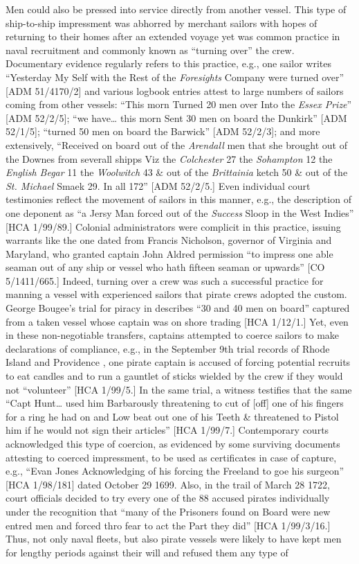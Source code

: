 Men could also be pressed into service directly from another vessel. This type of ship-to-ship impressment was abhorred by merchant sailors with hopes of returning to their homes after an extended voyage yet was common practice in naval recruitment and commonly known as “turning over” the crew. Documentary evidence regularly refers to this practice, e.g., one sailor writes “Yesterday My Self with the Rest of the \textit{Foresights} Company were turned over” [ADM 51/4170/2] and various logbook entries attest to large numbers of sailors coming from other vessels: “This morn Turned 20 men over Into the \textit{Essex Prize}” [ADM 52/2/5]; “we have… this morn Sent 30 men on board the Dunkirk” [ADM 52/1/5]; “turned 50 men on board the Barwick” [ADM 52/2/3]; and more extensively, “Received on board out of the \textit{Arendall} men that she brought out of the Downes from severall shipps Viz the \textit{Colchester} 27 the \textit{Sohampton} 12 the \textit{English Begar} 11 the \textit{Woolwitch} 43 \& out of the \textit{Brittainia} ketch 50 \& out of the \textit{St. Michael} Smaek 29. In all 172” [ADM 52/2/5.] Even individual court testimonies reflect the movement of sailors in this manner, e.g., the description of one deponent as “a Jersy Man forced out of the \textit{Success} Sloop in the West Indies” [HCA 1/99/89.] Colonial administrators were complicit in this practice, issuing warrants like the one dated \citealt{January1699} from Francis Nicholson, governor of Virginia and Maryland, who granted captain John Aldred permission “to impress one able seaman out of any ship or vessel who hath fifteen seaman or upwards” [CO 5/1411/665.] Indeed, turning over a crew was such a successful practice for manning a vessel with experienced sailors that pirate crews adopted the custom. George Bougee’s trial for piracy in \citealt{October1684} describes “30 and 40 men on board” captured from a taken vessel whose captain was on shore trading [HCA 1/12/1.] Yet, even in these non-negotiable transfers, captains attempted to coerce sailors to make declarations of compliance, e.g., in the September 9th trial records of Rhode Island and Providence \citealt{Plantation1725}, one pirate captain is accused of forcing potential recruits to eat candles and to run a gauntlet of sticks wielded by the crew if they would not “volunteer” [HCA 1/99/5.] In the same trial, a witness testifies that the same “Capt Hunt… used him Barbarously threatening to cut of [off] one of his fingers for a ring he had on and Low beat out one of his Teeth \& threatened to Pistol him if he would not sign their articles” [HCA 1/99/7.] Contemporary courts acknowledged this type of coercion, as evidenced by some surviving documents attesting to coerced impressment, to be used as certificates in case of capture, e.g., “Evan Jones Acknowledging of his forcing the Freeland to goe his surgeon” [HCA 1/98/181] dated October 29 1699. Also, in the trail of March 28 1722, court officials decided to try every one of the 88 accused pirates individually under the recognition that “many of the Prisoners found on Board were new entred men and forced thro fear to act the Part they did” [HCA 1/99/3/16.] Thus, not only naval fleets, but also pirate vessels were likely to have kept men for lengthy periods against their will and refused them any type of 